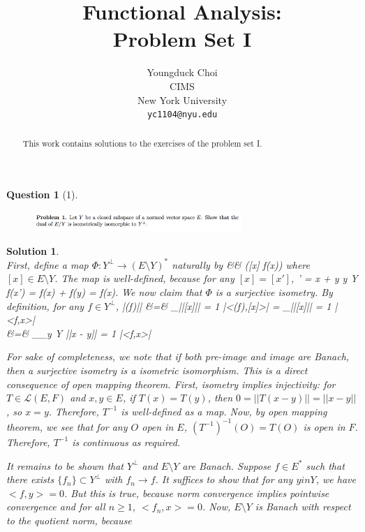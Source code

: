 \documentclass{article} %
\title{Functional Analysis: \\
Problem Set I}
\author{
Youngduck Choi \\
CIMS \\
New York University\\
\texttt{yc1104@nyu.edu} \\
}
\def\eQb#1\eQe{\begin{eqnarray*}#1\end{eqnarray*}}
\theoremstyle{quest}
\newtheorem*{question}{Question}
\newtheorem*{solution}{Solution}
\begin{document}
\maketitle

\begin{abstract}
This work contains solutions to the exercises of the problem set I.
\end{abstract}

\bigskip

\begin{question}[1]
\hfill
\begin{figure}[h!]
  \centering
    \includegraphics[width=0.7\textwidth]{funcA-h-e1-p1.png}
\end{figure}
\end{question}
\begin{solution} \hfill \\
First, define a map $\Phi:Y^{\perp} \to (E \setminus Y)^*$ naturally by
\eQb
f &\mapsto& ([x] \mapsto f(x))
\eQe 
where $[x] \in E\setminus Y$. The map is well-defined, because for any $[x] = [x']$,
\eQb
x' = x + y \>\>  \>\> y \in Y \>  \>
f(x') = f(x) + f(y) = f(x).
\eQe
We now claim that $\Phi$ is a surjective isometry. By definition, for any $f \in
Y^{\perp}$,
\eQb
||\Phi(f)|| &=& \sup_{||[x]|| = 1} |<\Phi(f),[x]>| = \sup_{||[x]|| = 1} |<f,x>| \\
&=& \sup_{\inf_{y \in Y} ||x - y|| = 1} |<f,x>| 
\eQe 

\bigskip

For sake of completeness, we note that if both pre-image and image are Banach,
then a surjective isometry is a isometric isomorphism. This is a direct consequence
of open mapping theorem. First, isometry implies injectivity: for $T \in
\mathscr{L}(E,F)$ and $x,y \in E$, if $T(x) = T(y)$,
then $0 = ||T(x-y)|| = ||x-y||$, so $x = y$. Therefore, $T^{-1}$ is well-defined
as a map. Now, by open mapping theorem, we see that for any $O$ open in $E$,
$(T^{-1})^{-1}(O) = T(O)$ is open in $F$. Therefore, $T^{-1}$ is continuous as required.

\bigskip

It remains to be shown that $Y^{\perp}$ and $E \setminus Y$ are Banach. Suppose
$f \in E^*$ such that there exists $\{f_n\} \subset Y^{\perp}$ with $f_n \to f$. It
suffices to show that for any $y in Y$, we have $<f,y> = 0$. But this is true,
because norm convergence implies pointwise convergence and for all $n \geq 1$,
$<f_n,x> = 0$. Now, $E \setminus Y$ is Banach with respect to the quotient norm,
because  

\end{solution}
\end{document}
